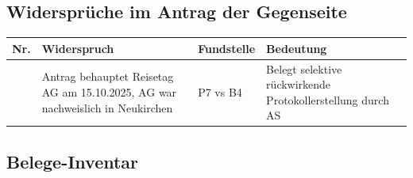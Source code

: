 \documentclass[
  11pt,
  a4paper,
]{article}
\newcounter{none}
\begin{document}
\subsection{Widersprüche im Antrag der
Gegenseite}\label{widerspruxfcche-im-antrag-der-gegenseite}

{\def\LTcaptype{none} %
\begin{longtable}[]{@{}
  >{\raggedright\arraybackslash}p{}
  >{\raggedright\arraybackslash}p{}
  >{\raggedright\arraybackslash}p{}
  >{\raggedright\arraybackslash}p{}@{}}
\toprule\noalign{}
\begin{minipage}[b]{\linewidth}\raggedright
Nr.
\end{minipage} & \begin{minipage}[b]{\linewidth}\raggedright
Widerspruch
\end{minipage} & \begin{minipage}[b]{\linewidth}\raggedright
Fundstelle
\end{minipage} & \begin{minipage}[b]{\linewidth}\raggedright
Bedeutung
\end{minipage} \\
\midrule\noalign{}
\endhead
\bottomrule\noalign{}
\endlastfoot
1 & Antrag behauptet Reisetag AG am 15.10.2025, AG war nachweislich in
Neukirchen & P7 vs B4 & Belegt selektive rückwirkende
Protokollerstellung durch AS \\
\end{longtable}
}

\subsection{Belege-Inventar}\label{belege-inventar}
\end{document}

